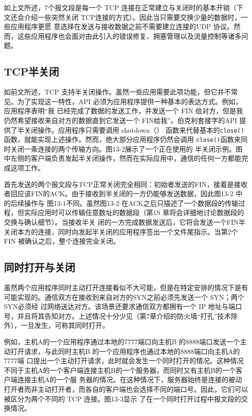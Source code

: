 如上文所述，7个报文段是每一个 TCP 连接在正常建立与关闭时的基本开销（下文还会介绍一些突然关闭
TCP连接的方式）。因此当只需要交换少量的数据时，一些应用程序更愿
意选择在发送与接收数据之前不需要建立连接的UDP 协议。然而，这些应用程序也会面对由此引入的错误修复、拥塞管理以及流量控制等诸多问题。
\subsection{TCP半关闭}
如前文所述，TCP 支持半关闭操作。虽然一些应用需要此项功能，但它并不常见。为了实现这一特性，API
必须为应用程序提供一种基本的表达方式。例如，应用程序表明“我
已经完成了数据的发送工作，并发送一个 FIN 给对方，但是我仍然希望接收来自对方的数据直到它发送一个 FIN给我”。伯克利套接字的API
提供了半关闭操作。应用程序只需要调用
shutdown（） 函数来代替基本的\verb|close()|函数，就能实现上述操作。然而，绝大部分应用程序仍然会调用
\verb|close()|函数来同时关闭一条连接的两个传输方向。图13-2展示了一个正在使用的
半关闭示例。图中左侧的客户端负责发起半关闭操作，然而在实际应用中，通信的任何一方都能完成这项工作。

首先发送的两个报文段与TCP正常关闭完全相同：初始者发送的FIN，接着是接收者回应该FIN的ACK。由于接收到半关闭的一方仍能够发送数据，因此图13-2
中的后续操作与
图13-1不同。虽然图13-2 在ACK之后只描述了一个数据段的传输过程，但实际应用时可以传输任意数址的数据段（第1S
章将会详细地讨论数据段的交换与确认细节）。当接收半关
闭的一方完成数据发送后，它将会发送一个FIN半关闭本方的连接，同时向发起半关闭的应用程序签出一个文件尾指示。当第2个FIN 被确认之后，整个连接完全关闭。

\subsection{同时打开与关闭}
虽然两个应用程序同时主动打开连接看似不大可能，但是在特定安排的情况下是有可能实现的。通信双方在接收到来自对方的SYN之前必须先发送一个
SYN；两个 SYN必须经
过网络送达对方。该场景还要求通信双方都拥有一个 IP
地址与端口号，并且将其告知对方。上述情况十分少见（第7章介绍的防火墙“打孔”技术除外），一旦发生，可称其同时打开。

例如，主机A的一个应用程序通过本地的7777端口向主机B 的8888端口发送一个主动打开请求，与此同时主机B
的一个应用程序也通过本地的8888端口向主机A的7777端
口提出一个主动打开请求，此时就会发生一个同时打开的情况。这种情况不同于主机A的一个客户端连接主机B的一个服务器，而同时又有主机B的一个客户端连接主机A的一个服
务器的情况。在这种情况下，服务器始终是连接的被动打开者而非主动打开者，而各自的客户端也会选择不同的端口号。因此，它们可以被区分为两个不同的
TCP 连接。图13-3显示
了在一个同时打开过程中报文段的交换情况。

